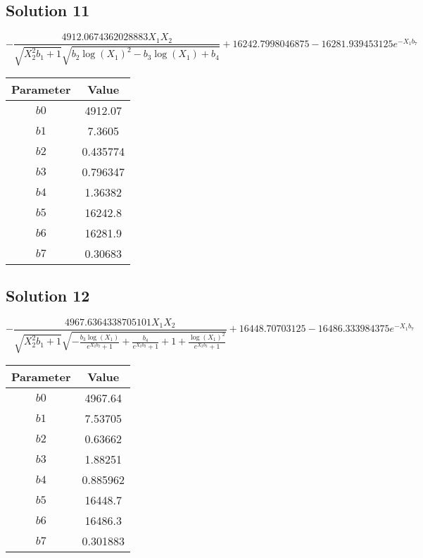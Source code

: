 \documentclass{article}
\begin{document}
\subsection*{Solution 11}
\[
- \frac{4912.0674362028883 X_{1} X_{2}}{\sqrt{X_{2}^{2} b_{1} + 1} \sqrt{b_{2} \log{\left(X_{1} \right)}^{2} - b_{3} \log{\left(X_{1} \right)} + b_{4}}} + 16242.7998046875 - 16281.939453125 e^{- X_{1} b_{7}}
\]
\begin{center}
\begin{tabular}{cc}
\toprule
Parameter & Value \\
\midrule
$b0$ & 4912.07 \\
$b1$ & 7.3605 \\
$b2$ & 0.435774 \\
$b3$ & 0.796347 \\
$b4$ & 1.36382 \\
$b5$ & 16242.8 \\
$b6$ & 16281.9 \\
$b7$ & 0.30683 \\
\bottomrule
\end{tabular}
\end{center}

\vspace{1em}
\subsection*{Solution 12}
\[
- \frac{4967.6364338705101 X_{1} X_{2}}{\sqrt{X_{2}^{2} b_{1} + 1} \sqrt{- \frac{b_{3} \log{\left(X_{1} \right)}}{e^{X_{2} b_{2}} + 1} + \frac{b_{4}}{e^{X_{2} b_{2}} + 1} + 1 + \frac{\log{\left(X_{1} \right)}^{2}}{e^{X_{2} b_{2}} + 1}}} + 16448.70703125 - 16486.333984375 e^{- X_{1} b_{7}}
\]
\begin{center}
\begin{tabular}{cc}
\toprule
Parameter & Value \\
\midrule
$b0$ & 4967.64 \\
$b1$ & 7.53705 \\
$b2$ & 0.63662 \\
$b3$ & 1.88251 \\
$b4$ & 0.885962 \\
$b5$ & 16448.7 \\
$b6$ & 16486.3 \\
$b7$ & 0.301883 \\
\bottomrule
\end{tabular}
\end{center}

\vspace{1em}
\end{document}
